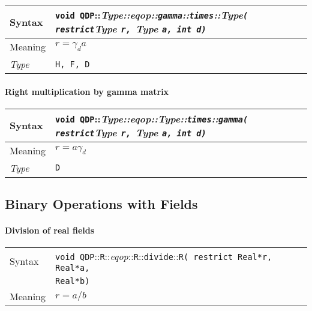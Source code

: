 \documentclass[12pt,letterpaper]{article}
\newcommand{\tReal}{Real}
\newcommand{\namespace}{QDP}
\newcommand{\ttdash}{{::}}
\newcommand{\itt}{\it Type}
\newcommand{\extraarg}{}
\begin{document}
\begin{flushleft}
  \begin{tabular}{|l|l|}
  \hline
  Syntax      & {\tt void \namespace}\ttdash\itt\ttdash{\it eqop}\ttdash{\tt gamma}\ttdash{\tt times}\ttdash\itt{\tt ( restrict}{\it Type }{\tt *r, }{\it Type }{\tt *a, int d\extraarg)} \\
  \hline
  Meaning     & $r = \gamma_d a$ \\
  \hline
  \itt     & {\tt H, F, D} \\
  \hline
  \end{tabular}
\end{flushleft}

\paragraph{Right multiplication by gamma matrix}
\begin{flushleft}
  \begin{tabular}{|l|l|}
  \hline
  Syntax      & {\tt void \namespace}\ttdash\itt\ttdash{\it eqop}\ttdash\itt\ttdash{\tt times}\ttdash{\tt gamma( restrict}{\it Type }{\tt *r, }{\it Type }{\tt *a, int d\extraarg)} \\
  \hline
  Meaning     & $r = a \gamma_d$ \\
  \hline
  \itt        & {\tt D} \\
  \hline
  \end{tabular}
\end{flushleft}

\subsection{Binary Operations with Fields}

\paragraph{Division of real fields}

\begin{flushleft}
  \begin{tabular}{|l|l|}
  \hline
  Syntax      & {\tt void \namespace}\ttdash{\tt R}\ttdash{\it eqop}\ttdash{\tt R}\ttdash{\tt divide}\ttdash{\tt R}{\tt ( restrict \tReal *r, \tReal *a, }\\
              & {\tt \tReal *b\extraarg)} \\
  \hline
  Meaning     & $r = a/b$ \\
  \hline
  \end{tabular}
\end{flushleft}
\end{document}
